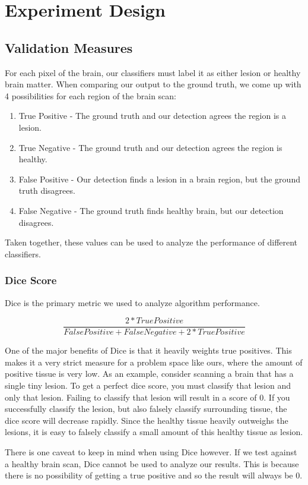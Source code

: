 \documentclass{article} %
\begin{document}
\section{Experiment Design}

\subsection{Validation Measures}
For each pixel of the brain, our classifiers must label it as either lesion or healthy brain matter. When comparing our output to the ground truth, we come up with 4 possibilities for each region of the brain scan:
\begin{enumerate}
  \item True Positive - The ground truth and our detection agrees the region is a lesion.
  \item True Negative - The ground truth and our detection agrees the region is healthy.
  \item False Positive - Our detection finds a lesion in a brain region, but the ground truth disagrees.
  \item False Negative - The ground truth finds healthy brain, but our detection disagrees.
\end{enumerate} 
Taken together, these values can be used to analyze the performance of different classifiers. 
\subsubsection{Dice Score}
Dice is the primary metric we used to analyze algorithm performance. 

$$\frac{2*True Positive}{False Positive + False Negative + 2*True Positive}$$

One of the major benefits of Dice is that it heavily weights true positives. This makes it a very strict measure for a problem space like ours, where the amount of positive tissue is very low. As an example, consider scanning a brain that has a single tiny lesion. To get a perfect dice score, you must classify that lesion and only that lesion. Failing to classify that lesion will result in a score of 0. If you successfully classify the lesion, but also falsely classify surrounding tissue, the dice score will decrease rapidly. Since the healthy tissue heavily outweighs the lesions, it is easy to falsely classify a small amount of this healthy tissue as lesion.

There is one caveat to keep in mind when using Dice however. If we test against a healthy brain scan, Dice cannot be used to analyze our results. This is because there is no possibility of getting a true positive and so the result will always be 0.
\end{document}
